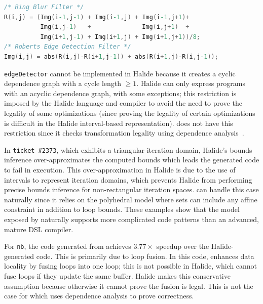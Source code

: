 \vspace{-0.15cm}
\begin{lstlisting}[language=C,escapechar=@,numbers=none]
/* Ring Blur Filter */
R(i,j) = (Img(i-1,j-1) + Img(i-1,j) + Img(i-1,j+1)+
          Img(i,j-1)   +              Img(i,j+1)  +
          Img(i+1,j-1) + Img(i+1,j) + Img(i+1,j+1))/8;
/* Roberts Edge Detection Filter */
Img(i,j) = abs(R(i,j)-R(i+1,j-1)) + abs(R(i+1,j)-R(i,j-1));
\end{lstlisting}
\vspace{-0.15cm}

\texttt{edgeDetector} cannot be implemented in Halide because it creates a cyclic dependence graph with a cycle length $\geq 1$.
Halide can only express programs with an acyclic dependence graph, with some exceptions;  this restriction is imposed by the Halide language and compiler to avoid the need to prove the legality of some optimizations (since proving the legality of certain optimizations is difficult in the Halide interval-based representation).
\framework{} does not have this restriction since it checks transformation legality using dependence analysis~\cite{feautrier_dataflow_1991}.

In \texttt{ticket \#2373}, which exhibits a triangular iteration domain,  Halide's bounds inference over-approximates the computed bounds which leads the generated code to fail in execution.  This over-approximation in Halide is due to the use of intervals to represent iteration domains, which prevents Halide from performing precise bounds inference for non-rectangular iteration spaces.  \framework{} can handle this case naturally since it relies on the polyhedral model where sets can include any affine constraint  in addition to loop bounds.  These examples show that the model exposed by \framework{} naturally supports more complicated code patterns than an advanced, mature DSL compiler.

For \texttt{nb}, the code generated from \framework{} achieves $3.77\times$ speedup over the Halide-generated code. This is primarily due to loop fusion.  In this code, \framework{} enhances data locality by fusing loops into one loop;  this is not possible in Halide, which cannot fuse loops if they update the same buffer.  Halide makes this conservative assumption because otherwise it cannot prove the fusion is legal. This is not the case for \framework{} which uses dependence analysis to prove correctness.

